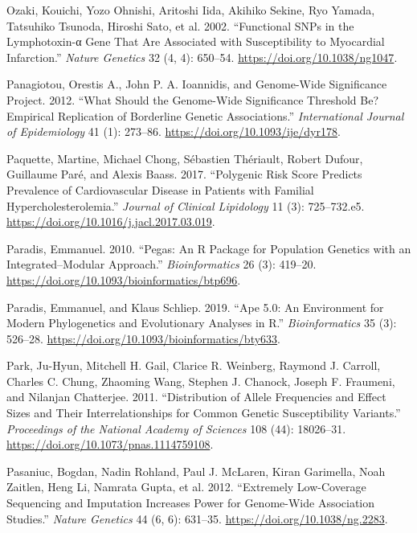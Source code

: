 \documentclass[
]{book}
\newlength{\cslhangindent}
\newlength{\cslentryspacingunit} %
\newenvironment{CSLReferences}[2] %
 {%
  \setlength{\parindent}{0pt}
  \ifodd #1
  \let\oldpar\par
  \def\par{\hangindent=\cslhangindent\oldpar}
  \fi
  \setlength{\parskip}{#2\cslentryspacingunit}
 }%
 {}
\begin{document}
\begin{CSLReferences}{1}{0}
\leavevmode{}%
Ozaki, Kouichi, Yozo Ohnishi, Aritoshi Iida, Akihiko Sekine, Ryo Yamada, Tatsuhiko Tsunoda, Hiroshi Sato, et al. 2002. {``Functional {SNPs} in the Lymphotoxin-α Gene That Are Associated with Susceptibility to Myocardial Infarction.''} \emph{Nature Genetics} 32 (4, 4): 650--54. \url{https://doi.org/10.1038/ng1047}.

\leavevmode{}%
Panagiotou, Orestis A., John P. A. Ioannidis, and Genome-Wide Significance Project. 2012. {``What Should the Genome-Wide Significance Threshold Be? {Empirical} Replication of Borderline Genetic Associations.''} \emph{International Journal of Epidemiology} 41 (1): 273--86. \url{https://doi.org/10.1093/ije/dyr178}.

\leavevmode{}%
Paquette, Martine, Michael Chong, Sébastien Thériault, Robert Dufour, Guillaume Paré, and Alexis Baass. 2017. {``Polygenic Risk Score Predicts Prevalence of Cardiovascular Disease in Patients with Familial Hypercholesterolemia.''} \emph{Journal of Clinical Lipidology} 11 (3): 725--732.e5. \url{https://doi.org/10.1016/j.jacl.2017.03.019}.

\leavevmode{}%
Paradis, Emmanuel. 2010. {``Pegas: An {R} Package for Population Genetics with an Integrated--Modular Approach.''} \emph{Bioinformatics} 26 (3): 419--20. \url{https://doi.org/10.1093/bioinformatics/btp696}.

\leavevmode{}%
Paradis, Emmanuel, and Klaus Schliep. 2019. {``Ape 5.0: An Environment for Modern Phylogenetics and Evolutionary Analyses in {R}.''} \emph{Bioinformatics} 35 (3): 526--28. \url{https://doi.org/10.1093/bioinformatics/bty633}.

\leavevmode{}%
Park, Ju-Hyun, Mitchell H. Gail, Clarice R. Weinberg, Raymond J. Carroll, Charles C. Chung, Zhaoming Wang, Stephen J. Chanock, Joseph F. Fraumeni, and Nilanjan Chatterjee. 2011. {``Distribution of Allele Frequencies and Effect Sizes and Their Interrelationships for Common Genetic Susceptibility Variants.''} \emph{Proceedings of the National Academy of Sciences} 108 (44): 18026--31. \url{https://doi.org/10.1073/pnas.1114759108}.

\leavevmode{}%
Pasaniuc, Bogdan, Nadin Rohland, Paul J. McLaren, Kiran Garimella, Noah Zaitlen, Heng Li, Namrata Gupta, et al. 2012. {``Extremely Low-Coverage Sequencing and Imputation Increases Power for Genome-Wide Association Studies.''} \emph{Nature Genetics} 44 (6, 6): 631--35. \url{https://doi.org/10.1038/ng.2283}.


\end{CSLReferences}
\end{document}
